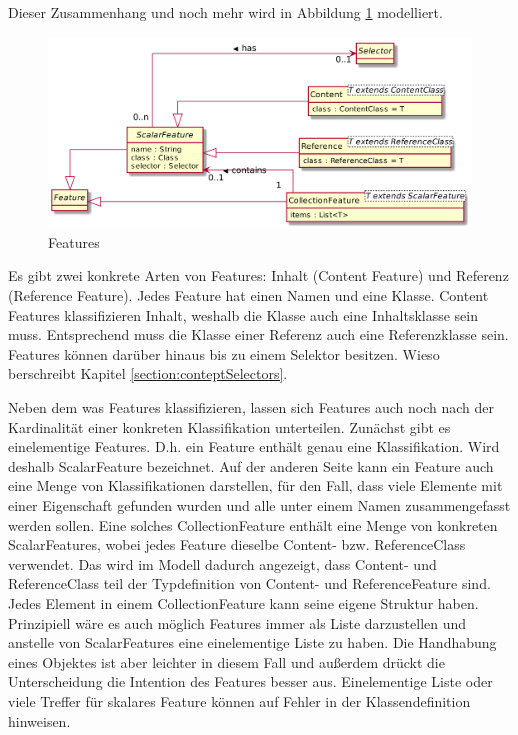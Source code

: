         Dieser Zusammenhang und noch mehr wird in Abbildung \ref{image:conceptFeatures} modelliert.

        \begin{figure}[htb]
            \centering
            \includegraphics[width=\textwidth]{../resources/concept/features.png}
            \caption{Features}
            \label{image:conceptFeatures}
        \end{figure}


        Es gibt zwei konkrete Arten von Features: Inhalt (Content Feature) und Referenz (Reference Feature).
        Jedes Feature hat einen Namen und eine Klasse.
        Content Features klassifizieren Inhalt, weshalb die Klasse auch eine Inhaltsklasse sein muss.
        Entsprechend muss die Klasse einer Referenz auch eine Referenzklasse sein.
        Features können darüber hinaus bis zu einem Selektor besitzen.
        Wieso berschreibt Kapitel \ref{section:conteptSelectors}.
    
        Neben dem was Features klassifizieren, lassen sich Features auch noch nach der
        Kardinalität einer konkreten Klassifikation unterteilen.
        Zunächst gibt es einelementige Features.
        D.h. ein Feature enthält genau eine Klassifikation.
        Wird deshalb ScalarFeature bezeichnet.
        Auf der anderen Seite kann ein Feature auch eine Menge von Klassifikationen
        darstellen, für den Fall, dass viele Elemente mit einer Eigenschaft gefunden wurden
        und alle unter einem Namen zusammengefasst werden sollen.
        Eine solches CollectionFeature enthält eine Menge von konkreten ScalarFeatures,
        wobei jedes Feature dieselbe Content- bzw. ReferenceClass verwendet.
        Das wird im Modell dadurch angezeigt, dass Content- und ReferenceClass teil der Typdefinition
        von Content- und ReferenceFeature sind.
        Jedes Element in einem CollectionFeature kann seine eigene Struktur haben.
        Prinzipiell wäre es auch möglich Features immer als Liste darzustellen
        und anstelle von ScalarFeatures eine einelementige Liste zu haben.
        Die Handhabung eines Objektes ist aber leichter in diesem Fall und außerdem drückt
        die Unterscheidung die Intention des Features besser aus.
        Einelementige Liste oder viele Treffer für skalares Feature können auf Fehler in der
        Klassendefinition hinweisen.


